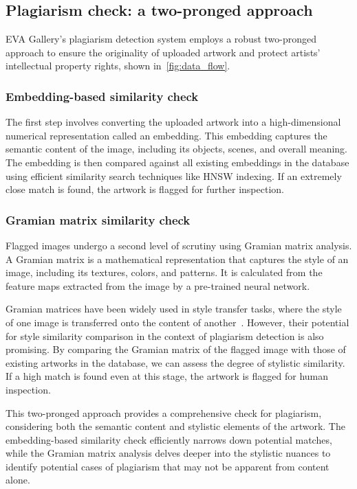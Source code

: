 \subsection{Plagiarism check: a two-pronged approach}

EVA Gallery's plagiarism detection system employs a robust two-pronged approach to ensure the originality of uploaded artwork and protect artists' intellectual property rights, shown in~\autoref{fig:data_flow}.

\subsubsection{Embedding-based similarity check}

The first step involves converting the uploaded artwork into a high-dimensional numerical representation called an embedding. This embedding captures the semantic content of the image, including its objects, scenes, and overall meaning. The embedding is then compared against all existing embeddings in the database using efficient similarity search techniques like HNSW indexing. If an extremely close match is found, the artwork is flagged for further inspection.

\subsubsection{Gramian matrix similarity check}

Flagged images undergo a second level of scrutiny using Gramian matrix analysis. A Gramian matrix is a mathematical representation that captures the style of an image, including its textures, colors, and patterns. It is calculated from the feature maps extracted from the image by a pre-trained neural network.

Gramian matrices have been widely used in style transfer tasks, where the style of one image is transferred onto the content of another~\cite{nicolas2019improving}. However, their potential for style similarity comparison in the context of plagiarism detection is also promising. By comparing the Gramian matrix of the flagged image with those of existing artworks in the database, we can assess the degree of stylistic similarity. If a high match is found even at this stage, the artwork is flagged for human inspection.

This two-pronged approach provides a comprehensive check for plagiarism, considering both the semantic content and stylistic elements of the artwork. The embedding-based similarity check efficiently narrows down potential matches, while the Gramian matrix analysis delves deeper into the stylistic nuances to identify potential cases of plagiarism that may not be apparent from content alone.

